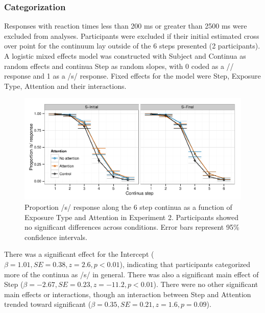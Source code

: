 \subsubsection{Categorization}

Responses with reaction times less than 200 ms or greater than 2500 ms were excluded from analyses. 
Participants were excluded if their initial estimated cross over point for the continuum lay outside of the 6 steps presented (2 participants).  
A logistic mixed effects model was constructed with Subject and Continua as random effects and continua Step as random slopes, with 0 coded as a /\textesh/ response and 1 as a /s/ response.  Fixed effects for the model were Step, Exposure Type, Attention and their interactions.

\begin{figure}[!ht]
\caption{Proportion /s/ response along the 6 step continua as a function of Exposure Type and Attention in Experiment 2.  Participants showed no significant differences across conditions. Error bars represent 95\% confidence intervals.}
\label{fig:exp2categ}
\begin{center}
\includegraphics[width=\textwidth]{graphs/exp2_categresults}
\end{center}
\end{figure}

There was a significant effect for the Intercept ($\beta = 1.01, SE = 0.38, z = 2.6, p < 0.01$), indicating that participants categorized more of the continua as /s/ in general.  There was also a significant main effect of Step ($\beta = -2.67, SE = 0.23, z = -11.2, p < 0.01$).  There were no other significant main effects or interactions, though an interaction between Step and Attention trended toward significant ($\beta = 0.35, SE = 0.21, z = 1.6, p = 0.09$).

